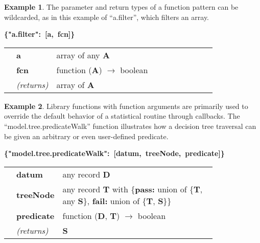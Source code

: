 \documentclass{article}
\newcommand{\PFAc}{\ttfamily\bfseries}
\newcommand{\PFAtp}{\ttfamily\bfseries}
\newcommand{\PFApf}{\ttfamily\bfseries}
\theoremstyle{definition}
\newtheorem{example}{Example}[section]
\begin{document}
\begin{example}
The parameter and return types of a function pattern can be wildcarded, as in this example of ``a.filter'', which filters an array.
\begin{center}
\begin{minipage}{0.9\linewidth}
\mbox{\PFAc \{"a.filter":$\!$ [a, fcn]\} \vspace{0.2 cm} \\} \vspace{0.2 cm} \\ \rm \begin{tabular}{p{0.01\linewidth} l p{0.8\linewidth}} & \PFAc a \rm & array of any {\PFAtp A} \\  & \PFAc fcn \rm & function ({\PFAtp A}) $\to$ boolean \\  & {\it (returns)} & array of {\PFAtp A} \\ \end{tabular}
\end{minipage}
\end{center}
\end{example}

\begin{example}
Library functions with function arguments are primarily used to override the default behavior of a statistical routine through callbacks.  The ``model.tree.predicateWalk'' function illustrates how a decision tree traversal can be given an arbitrary or even user-defined predicate.
\begin{center}
\begin{minipage}{0.9\linewidth}
\mbox{\PFAc \{"model.tree.predicateWalk":$\!$ [datum, treeNode, predicate]\} \vspace{0.2 cm} \\} \vspace{0.2 cm} \\ \rm \begin{tabular}{p{0.01\linewidth} l p{0.8\linewidth}} & \PFAc datum \rm & any record {\PFAtp D} \\  & \PFAc treeNode \rm & any record {\PFAtp T} with \{{\PFApf pass:}$\!$ union of \{{\PFAtp T}, any {\PFAtp S}\}, {\PFApf fail:}$\!$ union of \{{\PFAtp T}, {\PFAtp S}\}\} \\  & \PFAc predicate \rm & function ({\PFAtp D}, {\PFAtp T}) $\to$ boolean \\  & {\it (returns)} & {\PFAtp S} \\ \end{tabular}
\end{minipage}
\end{center}
\end{example}
\end{document}
